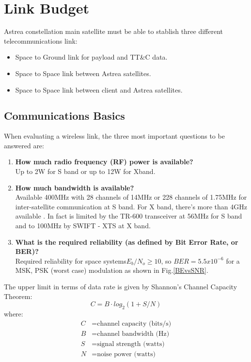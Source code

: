 \section{Link Budget} \label{Appendix:LinkBudget}

Astrea constellation main satellite must be able to stablish three different telecommunications link: 
\begin{itemize}
\item Space to Ground link for payload and TT\&C data.
\item Space to Space link between Astrea satellites.
\item Space to Space link between client and Astrea satellites.
\end{itemize} 

\subsection{Communications Basics}
When evaluating a wireless link, the three most important questions to be answered are: \cite{Note1998}\\

\begin{enumerate}
\item \textbf{How much radio frequency (RF) power is available?}\\
Up to 2W for S band or up to 12W for Xband.
\item \textbf{How much bandwidth is available?}\\
Available 400MHz with 28 channels of 14MHz or 228 channels of 1.75MHz for inter-satellite communication at S band. For X band, there's more than 4GHz available \cite{SecretariadeEstadodetelecomunicacionesyparalasociedaddelainformacion.2015}. In fact is limited by the TR-600 transceiver at 56MHz for S band and to 100MHz by SWIFT - XTS at X band.
\item \textbf{What is the required reliability (as defined by Bit Error Rate, or BER)?}\\	
Required reliability for space systems$E_b/N_o \geq 10$, so $BER=5.5x10^{-6}$ for a MSK, PSK (worst case) modulation as shown in Fig.\ref{BEvsSNR}.
\end{enumerate}

The upper limit in terms of data rate is given by Shannon's Channel Capacity Theorem:
\begin{equation}
	C=B\cdot log_2(1+S/N)
	\label{channelCapacity}
\end{equation}
where:
\begin{align*}
	C&= \text{channel capacity (bits/s)}\\
	B&= \text{channel bandwidth (Hz)}\\
	S&= \text{signal strength (watts)}\\
	N&= \text{noise power (watts)}
\end{align*}

